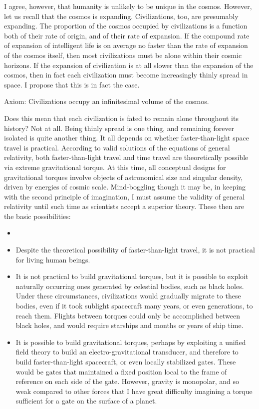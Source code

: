 \documentclass[english,11pt,letterpaper,onecolumn]{scrbook}
\begin{document}
I agree, however, that humanity is unlikely to be unique in the cosmos.  However, let us recall that the cosmos is expanding.  Civilizations, too, are presumably expanding.  The proportion of the cosmos occupied by civilizations is a function both of their rate of origin, and of their rate of expansion.  If the compound rate of expansion of intelligent life is on average no faster than the rate of expansion of the cosmos itself, then most civilizations must be alone within their cosmic horizons.  If the expansion of civilization is at all slower than the expansion of the cosmos, then in fact each civilization must become increasingly thinly spread in space.  I propose that this is in fact the case.

Axiom: 	Civilizations occupy an infinitesimal volume of the cosmos.


Does this mean that each civilization is fated to remain alone throughout its history?  Not at all.  Being thinly spread is one thing, and remaining forever isolated is quite another thing.  It all depends on whether faster-than-light space travel is practical.  According to valid solutions of the equations of general relativity, both faster-than-light travel and time travel are theoretically possible via extreme gravitational torque.  At this time, all conceptual designs for gravitational torques involve objects of astronomical size and singular density, driven by energies of cosmic scale.  Mind-boggling though it may be, in keeping with the second principle of imagination, I must assume the validity of general relativity until such time as scientists accept a superior theory.  These then are the basic possibilities:

\begin{itemize}
	\item 
\item	Despite the theoretical possibility of faster-than-light travel, it is not practical for living human beings.

\item	It is not practical to build gravitational torques, but it is possible to exploit naturally occurring ones generated by celestial bodies, such as black holes.  Under these circumstances, civilizations would gradually migrate to these bodies, even if it took sublight spacecraft many years, or even generations, to reach them.  Flights between torques could only be accomplished between black holes, and would require starships and months or years of ship time.

\item	It is possible to build gravitational torques, perhaps by exploiting a unified field theory to build an electro-gravitational transducer, and therefore to build faster-than-light spacecraft, or even locally stabilized gates.  These would be gates that maintained a fixed position local to the frame of reference on each side of the gate.  However, gravity is monopolar, and so weak compared to other forces that I have great difficulty imagining a torque sufficient for a gate on the surface of a planet.
\end{itemize}
\end{document}
